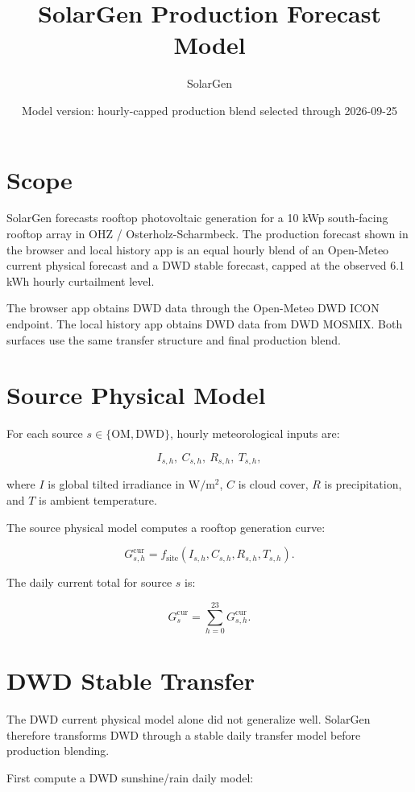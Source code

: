 \documentclass[11pt,a4paper]{article}
\title{SolarGen Production Forecast Model}
\author{SolarGen}
\date{Model version: hourly-capped production blend selected through 2026-09-25}
\begin{document}
\maketitle

\section{Scope}

SolarGen forecasts rooftop photovoltaic generation for a 10 kWp south-facing rooftop array in OHZ / Osterholz-Scharmbeck. The production forecast shown in the browser and local history app is an equal hourly blend of an Open-Meteo current physical forecast and a DWD stable forecast, capped at the observed 6.1 kWh hourly curtailment level.

The browser app obtains DWD data through the Open-Meteo DWD ICON endpoint. The local history app obtains DWD data from DWD MOSMIX. Both surfaces use the same transfer structure and final production blend.

\section{Source Physical Model}

For each source \(s \in \{\mathrm{OM}, \mathrm{DWD}\}\), hourly meteorological inputs are:

\[
I_{s,h},\ C_{s,h},\ R_{s,h},\ T_{s,h},
\]

where \(I\) is global tilted irradiance in \(\mathrm{W/m^2}\), \(C\) is cloud cover, \(R\) is precipitation, and \(T\) is ambient temperature.

The source physical model computes a rooftop generation curve:

\[
G^{\mathrm{cur}}_{s,h}
=
f_{\mathrm{site}}\left(I_{s,h}, C_{s,h}, R_{s,h}, T_{s,h}\right).
\]

The daily current total for source \(s\) is:

\[
G^{\mathrm{cur}}_{s}
=
\sum_{h=0}^{23} G^{\mathrm{cur}}_{s,h}.
\]

\section{DWD Stable Transfer}

The DWD current physical model alone did not generalize well. SolarGen therefore transforms DWD through a stable daily transfer model before production blending.

First compute a DWD sunshine/rain daily model:
\end{document}
